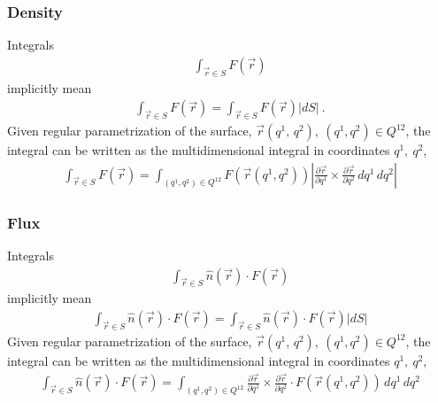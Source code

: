 \documentclass[letterpaper,10pt,english]{jupyterBook}
\begin{document}
\subsubsection{Density}
\label{\detokenize{ch/tensor-algebra-calculus/calculus-euclidean:tensor-calculus-integrals-surface-density}}\label{\detokenize{ch/tensor-algebra-calculus/calculus-euclidean:id1}}
\sphinxAtStartPar
Integrals
\begin{equation*}
\begin{split}\int_{\vec{r} \in S} F(\vec{r}) \end{split}
\end{equation*}
\sphinxAtStartPar
implicitly mean
\begin{equation*}
\begin{split}\int_{\vec{r} \in S} F(\vec{r}) = \int_{\vec{r} \in S} F(\vec{r}) |d S| \ .\end{split}
\end{equation*}
\sphinxAtStartPar
Given regular parametrization of the surface, \(\vec{r}(q^1, \, q^2), \ (q^1, q^2) \in Q^{12}\), the integral can be written as the multi\sphinxhyphen{}dimensional integral in coordinates \(q^1, \ q^2\),
\begin{equation*}
\begin{split}\int_{\vec{r} \in S} F(\vec{r}) = \int_{(q^1,q^2) \in Q^{12}} F(\vec{r}(q^1,q^2)) \left| \frac{\partial \vec{r}}{\partial q^1} \times \frac{\partial \vec{r}}{\partial q^2}  \, dq^1 \, dq^2 \right|\end{split}
\end{equation*}

\subsubsection{Flux}
\label{\detokenize{ch/tensor-algebra-calculus/calculus-euclidean:flux}}\label{\detokenize{ch/tensor-algebra-calculus/calculus-euclidean:tensor-calculus-integrals-surface-flux}}
\sphinxAtStartPar
Integrals
\begin{equation*}
\begin{split}\int_{\vec{r} \in S} \hat{n}(\vec{r}) \cdot F(\vec{r}) \end{split}
\end{equation*}
\sphinxAtStartPar
implicitly mean
\begin{equation*}
\begin{split}\int_{\vec{r} \in S} \hat{n}(\vec{r}) \cdot F(\vec{r}) = \int_{\vec{r} \in S} \hat{n}(\vec{r}) \cdot F(\vec{r}) |dS| \end{split}
\end{equation*}
\sphinxAtStartPar
Given regular parametrization of the surface, \(\vec{r}(q^1, \, q^2), \ (q^1, q^2) \in Q^{12}\), the integral can be written as the multi\sphinxhyphen{}dimensional integral in coordinates \(q^1, \ q^2\),
\begin{equation*}
\begin{split}\int_{\vec{r} \in S} \hat{n}(\vec{r}) \cdot F(\vec{r}) = \int_{(q^1,q^2) \in Q^{12}} \frac{\partial \vec{r}}{\partial q^1} \times \frac{\partial \vec{r}}{\partial q^2} \cdot  F(\vec{r}(q^1,q^2))\, dq^1 \, dq^2 \end{split}
\end{equation*}
\end{document}
